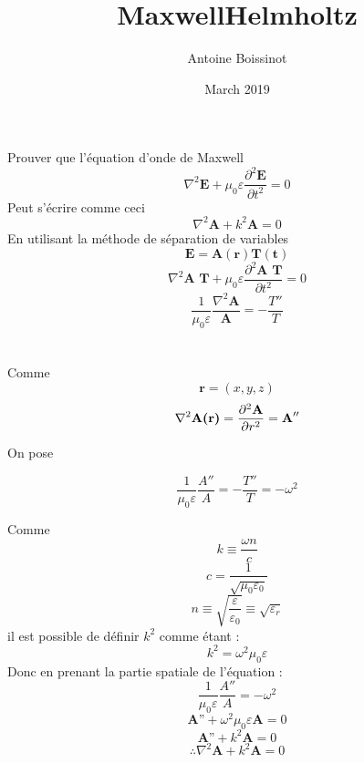 \documentclass{article}
\title{MaxwellHelmholtz}
\author{Antoine Boissinot}
\date{March 2019}
\begin{document}
Prouver que l'équation d'onde de Maxwell
    $$\nabla^{2}\textbf{E}+  \mu_{0} \varepsilon \frac{\partial^2\textbf{E}}{\partial t^2}  =0$$
Peut s'écrire comme ceci     
    $$\nabla^{2}\textbf{A}+ k^{2}\textbf{A}=0$$
En utilisant la méthode de séparation de variables
     $$\textbf{E}=\textbf{A}(\textbf{r})\textbf{T}(\textbf{t})$$
    $$\nabla^{2}\textbf{A T}+  \mu_{0} \varepsilon \frac{\partial^2\textbf{A T}}{\partial t^2}  =0$$
    $$\frac{1}{\mu_{0} \varepsilon}  \frac{\nabla^{2}\textbf{A}}{\textbf{A}}  =- \frac{T''}{T} $$
\\
\\
Comme $$\textbf{r}=(x,y,z)$$
$$\nabla^{2}\textbf{\textbf{A}(\textbf{r})} = \frac{\partial^2\textbf{A}}{\partial r^2} = \textbf{A}''$$

On pose

    $$\frac{1}{\mu_{0} \varepsilon}  \frac{A''}{A}  =- \frac{T''}{T}=- \omega^2 $$

Comme 
$$k \equiv  \frac{ \omega n}{c} $$
$$c= \frac{1}{ \sqrt{\mu_{0} \varepsilon_{0}} } $$
$$n \equiv  \sqrt{ \frac{ \varepsilon }{\varepsilon_{0}} }  \equiv  \sqrt{\varepsilon_{r}} $$
il est possible de définir $k^2$ comme étant : 
$$k^2=\omega^2  \mu_{0} \varepsilon $$
Donc en prenant la partie spatiale de l'équation :
$$\frac{1}{\mu_{0} \varepsilon}  \frac{A''}{A} =- \omega^2 $$
$$\textbf{A''}+\omega^2\mu_{0} \varepsilon \textbf{A}=0$$
$$\textbf{A''}+k^2\textbf{A}=0 $$
$$\therefore \nabla^{2}\textbf{A}+ k^{2}\textbf{A}=0$$
\end{document}

